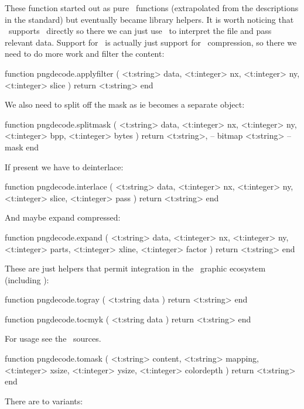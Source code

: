 \startsubsection[title=\PNG\ decoding]

These function started out as pure \LUA\ functions (extrapolated from the
descriptions in the standard) but eventually became library helpers. It is
worth noticing that \PDF\ supports \JPEG\ directly so there we can just use
\LUA\ to interpret the file and pass relevant data. Support for \PNG\ is
actually just support for \PNG\ compression, so there we need to do more
work and filter the content:

\starttyping[option=LUA]
function pngdecode.applyfilter (
    <t:string>  data,
    <t:integer> nx,
    <t:integer> ny,
    <t:integer> slice
)
    return <t:string>
end
\stoptyping

We also need to split off the mask as ie becomes a separate object:

\starttyping[option=LUA]
function pngdecode.splitmask (
    <t:string>  data,
    <t:integer> nx,
    <t:integer> ny,
    <t:integer> bpp,
    <t:integer> bytes
)
    return
        <t:string>, -- bitmap
        <t:string>  -- mask
end
\stoptyping

If present we have to deinterlace:

\starttyping[option=LUA]
function pngdecode.interlace (
    <t:string>  data,
    <t:integer> nx,
    <t:integer> ny,
    <t:integer> slice,
    <t:integer> pass
)
    return <t:string>
end
\stoptyping

And maybe expand compressed:

\starttyping[option=LUA]
function pngdecode.expand (
    <t:string>  data,
    <t:integer> nx,
    <t:integer> ny,
    <t:integer> parts,
    <t:integer> xline,
    <t:integer> factor
)
    return <t:string>
end
\stoptyping

These are just helpers that permit integration in the \CONTEXT\ graphic
ecosystem (including \METAPOST):

\starttyping[option=LUA]
function pngdecode.togray ( <t:string data )
    return <t:string>
end

function pngdecode.tocmyk ( <t:string data )
    return <t:string>
end
\stoptyping

For usage see the \CONTEXT\ sources.

\starttyping[option=LUA]
function pngdecode.tomask (
    <t:string>  content,
    <t:string>  mapping,
    <t:integer> xsize,
    <t:integer> ysize,
    <t:integer> colordepth
)
    return <t:string>
end
\stoptyping

There are to variants:

